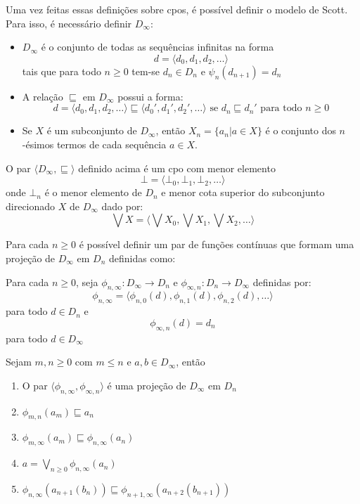 \documentclass[../main.tex]{subfiles}
\begin{document}
Uma vez feitas essas definições sobre cpos, é possível definir o modelo de Scott. Para isso, é necessário definir $D_{\infty}$:

\begin{definition}
    \begin{itemize}
        \item $D_{\infty}$ é o conjunto de todas as sequências infinitas na forma $$d = \langle d_0, d_1, d_2, \dots \rangle$$
        tais que para todo $n \geq 0$ tem-se $d_n \in D_n$ e $\psi_n(d_{n+1}) = d_n$
        \item A relação $\sqsubseteq$ em $D_{\infty}$ possui a forma: $$d = \langle d_0, d_1, d_2, \dots \rangle \sqsubseteq \langle d_0', d_1', d_2', \dots \rangle \text{ se } d_n \sqsubseteq d_n' \text{ para todo } n \geq 0 $$
        \item Se $X$ é um subconjunto de $D_{\infty}$, então $X_n = \{ a_n | a \in X \}$ é o conjunto dos $n$-ésimos termos de cada sequência $a \in X$.
    \end{itemize}
\end{definition}

\begin{lemma}
    O par $\langle D_{\infty}, \sqsubseteq \rangle$ definido acima é um cpo com menor elemento $$\bot = \langle \bot_0, \bot_1, \bot_2, \dots \rangle$$ onde $\bot_n$ é o menor elemento de $D_n$ e menor cota superior do subconjunto direcionado $X$ de $D_{\infty}$ dado por: $$\bigvee X = \langle \bigvee X_0, \bigvee X_1, \bigvee X_2, \dots \rangle $$
\end{lemma}

Para cada $n \geq 0$ é possível definir um par de funções contínuas que formam uma projeção de $D_{\infty}$ em $D_n$ definidas como:

\begin{definition}
    Para cada $n \geq 0$, seja $\phi_{n, \infty} : D_{\infty} \to D_n$ e $\phi_{\infty, n} : D_n \to D_{\infty}$ definidas por:
    $$\phi_{n, \infty} = \langle \phi_{n,0}(d), \phi_{n,1}(d), \phi_{n,2}(d), \dots \rangle$$ para todo $d \in D_n$ e
    $$\phi_{\infty, n} (d) = d_n$$ para todo $d \in D_{\infty}$
\end{definition}

\begin{lemma}
    Sejam $m, n \geq 0$ com $m \leq n$ e $a, b \in D_{\infty}$, então
    \begin{enumerate}
        \item O par $\langle \phi_{n, \infty}, \phi_{\infty, n} \rangle$ é uma projeção de $D_{\infty}$ em $D_n$
        \item $\phi_{m, n} (a_m) \sqsubseteq a_n$
        \item $\phi_{m, \infty} (a_m) \sqsubseteq \phi_{n, \infty} (a_n)$
        \item $a = \bigvee_{n \geq 0} \phi_{n, \infty} (a_n)$
        \item $\phi_{n, \infty} (a_{n+1}(b_n)) \sqsubseteq \phi_{n+1, \infty} (a_{n+2}(b_{n+1}))$
    \end{enumerate}
\end{lemma}
\end{document}
